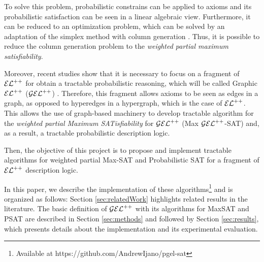 To solve this problem, probabilistic constrains can be applied to axioms and its probabilistic satisfaction can be seen in a linear algebraic view. Furthermore, it can be reduced to an optimization problem, which can be solved by an adaptation of the simplex method with column generation \citep{Fin2019b}. Thus, it is possible to reduce the column generation problem to the \emph{weighted partial maximum satisfiability}.

Moreover, recent studies show that it is necessary to focus on a fragment of $\mathcal{EL}^{++}$ for obtain a tractable probabilistic reasoning, which will be called {Graphic} $\mathcal{EL}^{++}$ ($\mathcal{GEL}^{++}$) \citep{Fin2020}. Therefore, this fragment allows axioms to be seen as edges in a graph, as opposed to hyperedges in a hypergraph, which is the case of $\mathcal{EL}^{++}$. This allows the use of graph-based machinery to develop tractable algorithm for the \emph{weighted partial Maximum SATisfiability} for $\mathcal{GEL}^{++}$ (Max $\mathcal{GEL}^{++}$-SAT) and, as a result, a tractable probabilistic description logic.

Then, the objective of this project is to propose and implement tractable algorithms for weighted partial Max-SAT and Probabilistic SAT for a fragment of $\mathcal{EL}^{++}$ description logic.

In this paper, we describe the implementation of these algorithms\footnote{Available at https://github.com/AndrewIjano/pgel-sat} and is organized as follows: Section \ref{sec:relatedWork} highlights related results in the literature. The basic definition of $\mathcal{GEL}^{++}$ with its algorithms for MaxSAT and PSAT are described in Section \ref{sec:methods} and followed by Section \ref{sec:results}, which presents details about the implementation and its experimental evaluation.
